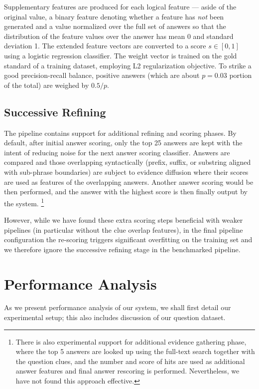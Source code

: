 \documentclass{poster15}
\begin{document}
Supplementary features are produced for each logical feature --- aside of the original value,
a binary feature denoting whether a feature has \textit{not} been generated
and a value normalized over the full set of answers
so that the distribution of the feature values over the answer
has mean 0 and standard deviation 1.
The extended feature vectors are converted to a score $s \in [0,1]$
using a logistic regression classifier.
The weight vector is trained on the gold standard of a training dataset,
employing L2 regularization objective.  To strike a good precision-recall
balance, positive answers (which are about $p=0.03$ portion of the total)
are weighed by $0.5/p$.

\subsection{Successive Refining}

The pipeline contains support for additional refining and scoring phases.
By default, after initial answer scoring,
only the top 25 answers are kept with the intent of reducing noise for the next answer scoring classifier.
Answers are compared and those overlapping syntactically (prefix, suffix, or substring aligned with sub-phrase boundaries)
are subject to evidence diffusion where their scores are used as features of the overlapping answers.
Another answer scoring would be then performed, and the answer with the highest score is then finally output by the system.%
\footnote{There is also experimental support for additional evidence gathering phase, where the top 5 answers are looked up using the full-text search together with the question clues, and the number and score of hits are used as additional answer features and final answer rescoring is performed.  Nevertheless, we have not found this approach effective.}

However, while we have found these extra scoring steps beneficial with
weaker pipelines (in particular without the clue overlap features),
in the final pipeline configuration the re-scoring triggers significant
overfitting on the training set and we therefore ignore
the successive refining stage in the benchmarked pipeline.


\section{Performance Analysis}
\label{sec:results}

As we present performance analysis of our system,
we shall first detail our experimental setup;
this also includes discussion of our question dataset.
\end{document}
